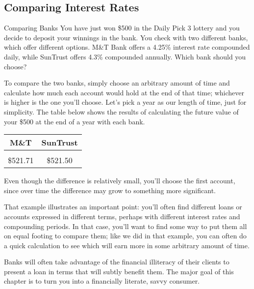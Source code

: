 \subsection{Comparing Interest Rates}
\begin{example}[https://www.youtube.com/watch?v=8xqmxdrDOcQ&list=PLfmpjsIzhztsZtnb7HnXrQ8SLoiOCIcAM&index=19]{Comparing Banks}
You have just won \$500 in the Daily Pick 3 lottery and you decide to deposit your winnings in the bank.  You check with two different banks, which offer different options.  M\&T Bank offers a 4.25\% interest rate compounded daily, while SunTrust offers 4.3\% compounded annually.  Which bank should you choose?

\solline
To compare the two banks, simply choose an arbitrary amount of time and calculate how much each account would hold at the end of that time; whichever is higher is the one you'll choose.  Let's pick a year as our length of time, just for simplicity.  The table below shows the results of calculating the future value of your \$500 at the end of a year with each bank.
\begin{center}
\begin{tabular}{c c}
M\&T & SunTrust\\
\hline
& \\
\$521.71 & \$521.50
\end{tabular}
\end{center}
Even though the difference is relatively small, you'll choose the first account, since over time the difference may grow to something more significant.
\end{example}
\vfill

That example illustrates an important point: you'll often find different loans or accounts expressed in different terms, perhaps with different interest rates and compounding periods.  In that case, you'll want to find some way to put them all on equal footing to compare them; like we did in that example, you can often do a quick calculation to see which will earn more in some arbitrary amount of time.

Banks will often take advantage of the financial illiteracy of their clients to present a loan in terms that will subtly benefit them.  The major goal of this chapter is to turn you into a financially literate, savvy consumer.
\vfill

